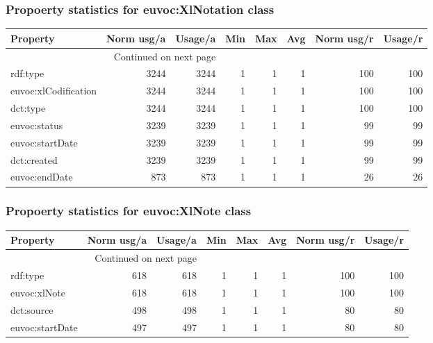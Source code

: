 \documentclass[10pt,a4paper,titlepage,final]{article}
\begin{document}
\subsubsection{Propoerty statistics for euvoc:XlNotation class}
\begin{longtable}{lrrrrrrr}
\toprule
             Property &  Norm usg/a &  Usage/a &  Min &  Max &  Avg &  Norm usg/r &  Usage/r \\
\midrule
\endhead
\midrule
\multicolumn{3}{r}{{Continued on next page}} \\
\midrule
\endfoot

\bottomrule
\endlastfoot
             rdf:type &        3244 &     3244 &    1 &    1 &    1 &         100 &      100 \\
 euvoc:xlCodification &        3244 &     3244 &    1 &    1 &    1 &         100 &      100 \\
             dct:type &        3244 &     3244 &    1 &    1 &    1 &         100 &      100 \\
         euvoc:status &        3239 &     3239 &    1 &    1 &    1 &          99 &       99 \\
      euvoc:startDate &        3239 &     3239 &    1 &    1 &    1 &          99 &       99 \\
          dct:created &        3239 &     3239 &    1 &    1 &    1 &          99 &       99 \\
        euvoc:endDate &         873 &      873 &    1 &    1 &    1 &          26 &       26 \\
\end{longtable}


\subsubsection{Propoerty statistics for euvoc:XlNote class}
\begin{longtable}{lrrrrrrr}
\toprule
        Property &  Norm usg/a &  Usage/a &  Min &  Max &  Avg &  Norm usg/r &  Usage/r \\
\midrule
\endhead
\midrule
\multicolumn{3}{r}{{Continued on next page}} \\
\midrule
\endfoot

\bottomrule
\endlastfoot
        rdf:type &         618 &      618 &    1 &    1 &    1 &         100 &      100 \\
    euvoc:xlNote &         618 &      618 &    1 &    1 &    1 &         100 &      100 \\
      dct:source &         498 &      498 &    1 &    1 &    1 &          80 &       80 \\
 euvoc:startDate &         497 &      497 &    1 &    1 &    1 &          80 &       80 \\
\end{longtable}
\end{document}
